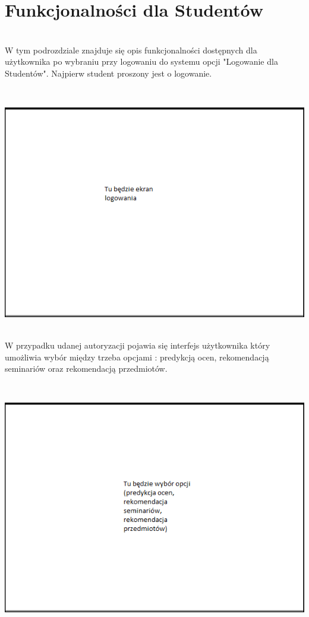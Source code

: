 \documentclass[licencjacka]{pracamgr}
\begin{document}
\section{Funkcjonalności dla Studentów}
~\\ \indent
W tym podrozdziale znajduje się opis funkcjonalności dostępnych dla użytkownika po wybraniu przy logowaniu do systemu opcji "Logowanie dla Studentów". Najpierw student proszony jest o logowanie. \par
~\\
\begin{minipage}{\linewidth}
	 \centering
           \includegraphics[scale=0.7]{logowanielic.png}
\end{minipage} \\

W przypadku udanej autoryzacji pojawia się interfejs użytkownika który umożliwia wybór między trzeba opcjami : predykcją ocen, rekomendacją seminariów oraz rekomendacją przedmiotów. \par
~\\
\begin{minipage}{\linewidth}
	\centering
           \includegraphics[scale=0.7]{wyborstudent.png}
\end{minipage} \\ 
\end{document}

